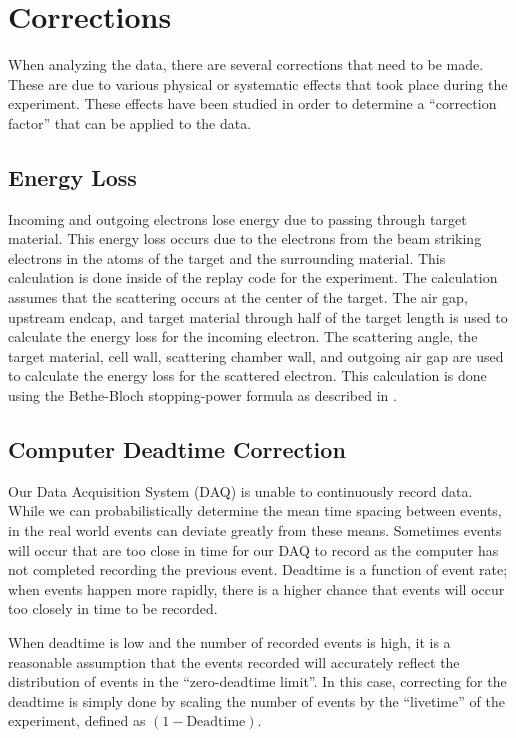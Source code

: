 \section{Corrections}

When analyzing the data, there are several corrections that need to be made. These are due to various physical or systematic effects that took place during the experiment. These effects have been studied in order to determine a ``correction factor'' that can be applied to the data.

\subsection{Energy Loss}

Incoming and outgoing electrons lose energy due to passing through target material. This energy loss occurs due to the electrons from the beam striking electrons in the atoms of the target and the surrounding material. This calculation is done inside of the replay code for the experiment. The calculation assumes that the scattering occurs at the center of the target. The air gap, upstream endcap, and target material through half of the target length is used to calculate the energy loss for the incoming electron. The scattering angle, the target material, cell wall, scattering chamber wall, and outgoing air gap are used to calculate the energy loss for the scattered electron. This calculation is done using the Bethe-Bloch stopping-power formula as described in \cite{eloss}.

\subsection{Computer Deadtime Correction}

Our Data Acquisition System (DAQ) is unable to continuously record data. While we can probabilistically determine the mean time spacing between events, in the real world events can deviate greatly from these means. Sometimes events will occur that are too close in time for our DAQ to record as the computer has not completed recording the previous event. Deadtime is a function of event rate; when events happen more rapidly, there is a higher chance that events will occur too closely in time to be recorded.

When deadtime is low and the number of recorded events is high, it is a reasonable assumption that the events recorded will accurately reflect the distribution of events in the ``zero-deadtime limit''. In this case, correcting for the deadtime is simply done by scaling the number of events by the ``livetime'' of the experiment, defined as $\left(1-\text{Deadtime}\right)$.

